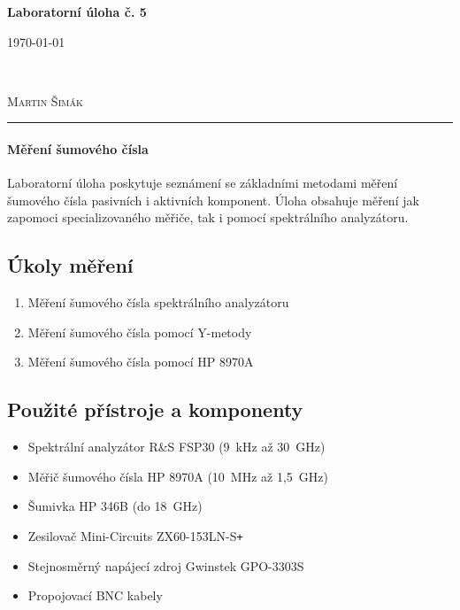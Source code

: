 \documentclass[11pt,a4paper]{article}
\newcommand{\plus}{{\texttt{+}}}
\begin{document}

\begin{center}
    {\LARGE\textbf{Laboratorní úloha č. 5}}\\[3mm]
    \begin{minipage}{0.4\textwidth}
        \begin{flushleft}
            \textsc{\today}
        \end{flushleft}
    \end{minipage}
    ~
    \begin{minipage}{0.4\textwidth}
        \begin{flushright}
            \textsc{Martin Šimák}
        \end{flushright}
    \end{minipage}
    \noindent\rule{14.5cm}{0.4pt}
\end{center}

\paragraph*{Měření šumového čísla} Laboratorní úloha poskytuje seznámení se základními metodami měření šumového čísla pasivních i aktivních komponent. Úloha obsahuje měření jak zapomoci specializovaného měřiče, tak i pomocí spektrálního analyzátoru.

\subsection*{Úkoly měření}
\begin{enumerate}
    \item Měření šumového čísla spektrálního analyzátoru
    \item Měření šumového čísla pomocí Y-metody
    \item Měření šumového čísla pomocí HP 8970A
\end{enumerate}

\subsection*{Použité přístroje a komponenty}
\begin{itemize}
    \item Spektrální analyzátor R\&S FSP30 (9~kHz až 30~GHz)
    \item Měřič šumového čísla HP 8970A (10~MHz až 1,5~GHz)
    \item Šumivka HP 346B (do 18~GHz)
    \item Zesilovač Mini-Circuits ZX60-153LN-S\plus
    \item Stejnosměrný napájecí zdroj Gwinstek GPO-3303S 
    \item Propojovací BNC kabely
\end{itemize}
\end{document}
